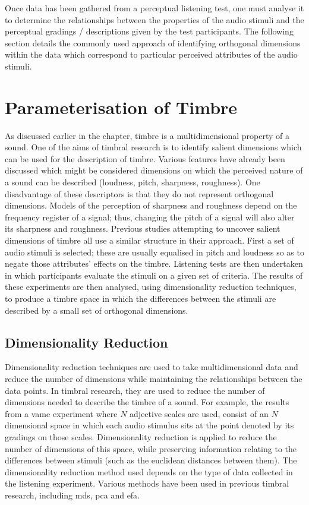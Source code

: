 			Once data has been gathered from a perceptual listening test, one must analyse it to determine the
			relationships between the properties of the audio stimuli and the perceptual gradings /
			descriptions given by the test participants. The following section details the commonly used
			approach of identifying orthogonal dimensions within the data which correspond to particular
			perceived attributes of the audio stimuli.

\section{Parameterisation of Timbre}
\label{sec:Timbre-Parameterisation}
	As discussed earlier in the chapter, timbre is a multidimensional property of a sound. One of the aims of timbral
	research is to identify salient dimensions which can be used for the description of timbre. Various features have
	already been discussed which might be considered dimensions on which the perceived nature of a sound can be
	described (loudness, pitch, sharpness, roughness). One disadvantage of these descriptors is that they do not
	represent orthogonal dimensions. Models of the perception of sharpness and roughness depend on the frequency
	register of a signal; thus, changing the pitch of a signal will also alter its sharpness and roughness. Previous
	studies attempting to uncover salient dimensions of timbre all use a similar structure in their approach.  First a
	set of audio stimuli is selected; these are usually equalised in pitch and loudness so as to negate those
	attributes' effects on the timbre. Listening tests are then undertaken in which participants evaluate the stimuli
	on a given set of criteria. The results of these experiments are then analysed, using dimensionality reduction
	techniques, to produce a timbre space in which the differences between the stimuli are described by a small set of
	orthogonal dimensions.

	\subsection{Dimensionality Reduction}
	\label{sec:Timbre-Parameterisation-DimensionalityReduction}
		Dimensionality reduction techniques are used to take multidimensional data and reduce the number of
		dimensions while maintaining the relationships between the data points. In timbral research, they are used
		to reduce the number of dimensions needed to describe the timbre of a sound. For example, the results from
		a \acrshort{vame} experiment where $N$ adjective scales are used, consist of an $N$ dimensional space in
		which each audio stimulus sits at the point denoted by its gradings on those scales. Dimensionality
		reduction is applied to reduce the number of dimensions of this space, while preserving information
		relating to the differences between stimuli (such as the euclidean distances between them). The
		dimensionality reduction method used depends on the type of data collected in the listening experiment.
		Various methods have been used in previous timbral research, including \acrfull{mds}, \acrfull{pca} and
		\acrfull{efa}.

